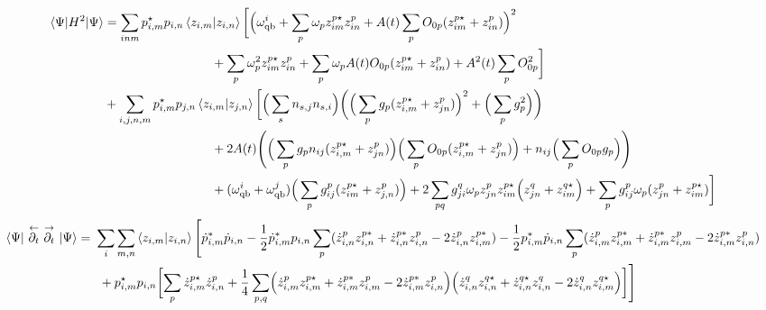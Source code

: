 \documentclass[prb]{revtex4}
\begin{document}
\begin{align*}						
\braket{\Psi |  H^2 | \Psi}  & =\sum_{inm} p_{i,m}^\star p_{i,n} \braket{ z_{i,m} | z_{i,n} } \bigg[\Bigl( \omega_{\rm qb}^i +\sum_p \omega_p z_{im}^{p\star} z_{in}^p + A(t)\sum_p O_{0p}(z_{im}^{p\star}+z_{in}^p)\Bigr)^2 \notag \\
& \hspace{3cm}+ \sum_p \omega_p^2 z_{im}^{p\star} z_{in}^p + \sum_p\omega_p A(t)O_{0p}(z_{im}^{p\star}+z_{in}^p) +A^2(t)\sum_p O_{0p}^2  \bigg] \notag \\
& +\sum_{i,j,n,m}p_{i,m}^\star p_{j,n}\braket{z_{i,m}|z_{j,n}} \bigg[  \Big(\sum_s n_{s,j} n_{s,i}\Big)  \bigg( \Big(\sum_{p }g_{p}  ( z_{i,m}^{p\star} + z_{jn}^p)\Big)^2 +  \Big(\sum_p g_{p}^2 \Big) \bigg)\\
& \hspace{3cm}+ 2A(t)  \Bigg( \Big(\sum_{p }g_{p} n_{ij} ( z_{i,m}^{p\star} + z_{jn}^p) \Big) \Big(\sum_{p } O_{0p}  ( z_{i,m}^{p\star} + z_{jn}^p) \Big) + n_{ij}\Big( \sum_pO_{0p}  g_{p}\Big)\Bigg)  \notag \\ 
& \hspace{3cm}+( \omega_{\rm qb}^i+ \omega_{\rm qb}^j ) \Big(  \sum_p g_{ij}^p ( z_{im}^{p\star} + z_{j,n}^p )  \Big) + 2\sum_{pq} g_{ji}^q \omega_p  z_{jn}^p z_{im}^{p\star}\Big( z_{jn}^q+z_{im}^{q\star}\Big)    + \sum_p g_{ij}^p  \omega_p (z_{jn}^p + z_{im}^{p\star} ) \biggr] 
\end{align*}
%					 
\begin{align*}
	  \braket{\Psi |\  \overset{\leftarrow}{\partial_t}\ \overset{\rightarrow}{\partial_t}\ | \Psi} =\ &\sum_i \sum_{m,n} \braket{z_{i,m} | z_{i,n}} \Biggl[  \dot p_{i,m}^{*}\dot p_{i,n} - \frac{1}{2} \dot p_{i,m}^{*}p_{i,n}  \sum_p (  \dot z_{i,n}^{p} z^{p*}_{i,n} +  \dot z_{i,n}^{p*} z^p_{i,n} - 2 \dot z_{i,n}^{p} z^{p*}_{i,m} ) - \frac{1}{2} p_{i,m}^{*}\dot p_{i,n} \sum_p (  \dot z_{i,m}^{p} z^{p*}_{i,m} +  \dot z_{i,m}^{p*} z^p_{i,m} - 2 \dot z_{i,m}^{p*} z^{p}_{i,n}) \\
						&\ + p_{i,m}^\star p_{i,n} \biggl[ \sum_p  \dot z_{i,m}^{p\star} \dot z_{i,n}^p + \frac{1}{4}\sum_{p,q} \Bigl( \dot z_{i,m}^{p} z^{p\star}_{i,m}+\dot z_{i,m}^{p*} z^p_{i,m} - 2\dot z_{i,m}^{p*} z^{p}_{i,n}\Bigr) \Bigl(     \dot z_{i,n}^{q} z^{q\star}_{i,n} + \dot z_{i,n}^{q\star} z^{q}_{i,n} - 2  \dot z_{i,n}^{q} z^{q\star}_{i,m} \Bigr) \biggr] \Biggl] 
\end{align*}
%		
\end{document}

